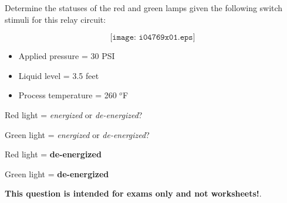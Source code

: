 

Determine the statuses of the red and green lamps given the following switch stimuli for this relay circuit:

$$\texttt{[image: i04769x01.eps]}$$

\begin{itemize}
\item{} Applied pressure = 30 PSI
\item{} Liquid level = 3.5 feet
\item{} Process temperature = 260 $^{o}$F
\end{itemize}

\vskip 10pt

Red light = {\it energized} or {\it de-energized}?

\vskip 10pt

Green light = {\it energized} or {\it de-energized}?







Red light = {\bf de-energized}

Green light = {\bf de-energized}







{\bf This question is intended for exams only and not worksheets!}.


